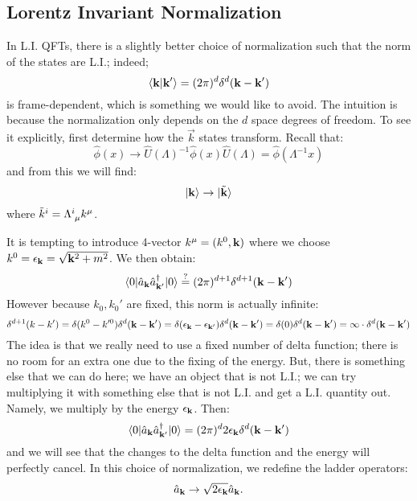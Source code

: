 \subsection{Lorentz Invariant Normalization}
In L.I. QFTs, there is a slightly better choice of normalization such that the norm of the states are L.I.; indeed;
\begin{equation}
    \langle \mathbf{k} \lvert \mathbf{k}' \rangle = (2\pi)^d\delta^d(\mathbf{k} - \mathbf{k}')
\end{equation}
is frame-dependent, which is something we would like to avoid. The intuition is because the normalization only depends on the $d$ space degrees of freedom. To see it explicitly, first determine how the $\vec{k}$ states transform. Recall that:
\begin{equation}
    \hat{\phi}(x) \to \hat{U}(\Lambda)^{-1}\hat{\phi}(x)\hat{U}(\Lambda) = \hat{\phi}(\Lambda^{-1}x)
\end{equation}
and from this we will find:
\begin{equation}
    \lvert \mathbf{k} \rangle \to \lvert \tilde{\mathbf{k}} \rangle
\end{equation}
where $\tilde{k}^i = \Lambda^i_{\sp\mu}k^\mu$. 

It is tempting to introduce 4-vector $k^\mu = (k^0, \mathbf{k})$ where we choose $k^0 = \epsilon_{\mathbf{k}} = \sqrt{\mathbf{k}^2 + m^2}$. We then obtain:
\begin{equation}
    \langle 0 \rvert\hat{a}_{\mathbf{k}}\hat{a}^\dagger_{\mathbf{k}'}\lvert 0 \rangle \stackrel{?}{=} (2\pi)^{d+1} \delta^{d+1}(\mathbf{k} - \mathbf{k}')
\end{equation} 
However because $k_0, k_0'$ are fixed, this norm is actually infinite:
\begin{equation}
    \delta^{d+1}(k-k') = \delta(k^0-k'^0)\delta^{d}(\mathbf{k} - \mathbf{k}') = \delta(\epsilon_{\mathbf{k}} - \epsilon_{\mathbf{k}'})\delta^d(\mathbf{k} - \mathbf{k}') = \delta(0)\delta^d(\mathbf{k} - \mathbf{k}') = \infty \cdot \delta^d(\mathbf{k} - \mathbf{k}')
\end{equation}
The idea is that we really need to use a fixed number of delta function; there is no room for an extra one due to the fixing of the energy. But, there is something else that we can do here; we have an object that is not L.I.; we can try multiplying it with something else that is not L.I. and get a L.I. quantity out. Namely, we multiply by the energy $\epsilon_{\mathbf{k}}$. Then:
\begin{equation}
    \langle 0 \rvert\hat{a}_{\mathbf{k}}\hat{a}^\dagger_{\mathbf{k}'}\lvert 0 \rangle = (2\pi)^d 2\epsilon_{\mathbf{k}} \delta^d(\mathbf{k} - \mathbf{k}')
\end{equation}
and we will see that the changes to the delta function and the energy will perfectly cancel. In this choice of normalization, we redefine the ladder operators:
\begin{equation}
    \hat{a}_{\mathbf{k}} \to \sqrt{2\epsilon_{\mathbf{k}}}\hat{a}_{\mathbf{k}}.
\end{equation}

